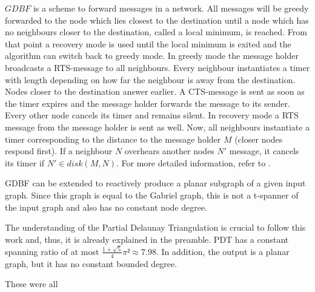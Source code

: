 $GDBF $ is a scheme to forward messages in a network.
All messages will be greedy forwarded to the node which lies closest to the destination until a node which has no neighbours closer to the destination, called a local minimum, is reached.
From that point a recovery mode is used until the local minimum is exited and the algorithm can switch back to greedy mode.
In greedy mode the message holder broadcasts a RTS-message to all neighbours.
Every neighbour instantiates a timer with length depending on how far the neighbour is away from the destination. 
Nodes closer to the destination answer earlier.
A CTS-message is sent as soon as the timer expires and the message holder forwards the message to its sender. 
Every other node cancels its timer and remains silent.
In recovery mode a RTS message from the message holder is sent as well.
Now, all neighbours instantiate a timer corresponding to the distance to the message holder $M $ (closer nodes respond first).
If a neighbour $N $ overhears another nodes $N' $ message, it cancels its timer if $N' \in disk(M, N) $.
For more detailed information, refer to \cite{Chawla2006}.

GDBF can be extended to reactively produce a planar subgraph of a given input graph. 
Since this graph is equal to the Gabriel graph, this is not a t-spanner of the input graph and also has no constant node degree.

The understanding of the Partial Delaunay Triangulation is crucial to follow this work and, thus, it is already explained in the preamble.
PDT has a constant spanning ratio of at most $\frac{1+\sqrt{5}}{4}\pi ² \approx 7.98 $.
In addition, the output is a planar graph, but it has no constant bounded degree.


These were all 






